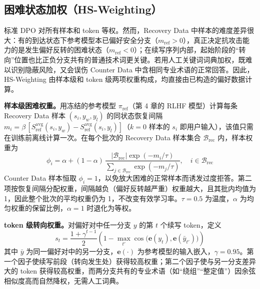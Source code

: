 \documentclass[fontset=fandol,type=master,campus=shenzhen,etitleauto=true]{hithesisbook}
\begin{document}
\subsection{困难状态加权（HS-Weighting）}\label{rt-weighting}

标准 DPO 对所有样本和 token 等权。然而，Recovery Data 中样本的难度差异很大：有的到达状态下参考模型本已偏好安全分支（$m_{\text{ref}} > 0$），真正决定抗攻击能力的是发生偏好反转的困难状态（$m_{\text{ref}} < 0$）；在续写序列内部，起始阶段的“转向”位置也比正负分支共有的普通技术词更关键。若用人工关键词词典加权，既难以识别隐蔽风险，又会误伤 Counter Data 中含相同专业术语的正常回答。因此，HS-Weighting 由样本级和 token 级两项权重构成，均直接由已构造的偏好数据计算。

\textbf{样本级困难权重。}用冻结的参考模型 $\pi_{\text{ref}}$（第 4 章的 RLHF 模型）计算每条 Recovery Data 样本 $(s_i, y_w, y_l)$ 的同状态恢复间隔 $m_i = \beta\,[S^{\text{avg}}_{\text{ref}}(s_i, y_w) - S^{\text{avg}}_{\text{ref}}(s_i, y_l)]$（$k = 0$ 样本的 $s_i$ 即用户输入），该值只需在训练前离线计算一次。在每个批次的 Recovery Data 样本集合 $\mathcal{B}_{\text{rec}}$ 内，样本权重为
\begin{equation}
\phi_i = \alpha + (1 - \alpha)\,\frac{|\mathcal{B}_{\text{rec}}| \exp(-m_i / \tau)}{\sum_{j \in \mathcal{B}_{\text{rec}}} \exp(-m_j / \tau)}, \quad i \in \mathcal{B}_{\text{rec}}
\end{equation}
Counter Data 样本恒取 $\phi_i = 1$，以免放大困难的正常样本而诱发过度拒答。第二项按恢复间隔分配权重，间隔越负（偏好反转越严重）权重越大，且其批内均值为 1，因此整个批次的平均权重仍为 1，不改变有效学习率。$\tau = 0.5$ 为温度，$\alpha$ 为均匀权重的保留比例，$\alpha = 1$ 时退化为等权。

\textbf{token 级转向权重。}对偏好对中任一分支 $y$ 的第 $t$ 个续写 token，定义
\begin{equation}
s_t = \frac{1 + \gamma^{t-1}}{2} \left( 1 - \max_{t'} \cos\!\big(\mathbf{e}(y_t), \mathbf{e}(\bar{y}_{t'})\big) \right)
\end{equation}
其中 $\bar{y}$ 为同一偏好对中的另一分支，$\mathbf{e}(\cdot)$ 为参考模型的输入嵌入，$\gamma = 0.95$。第一个因子使续写前段（转向发生处）获得较高权重；第二个因子使与另一分支差异大的 token 获得较高权重，而两分支共有的专业术语（如“绕组”“整定值”）因余弦相似度高而自然降权，无需人工词典。
\end{document}
